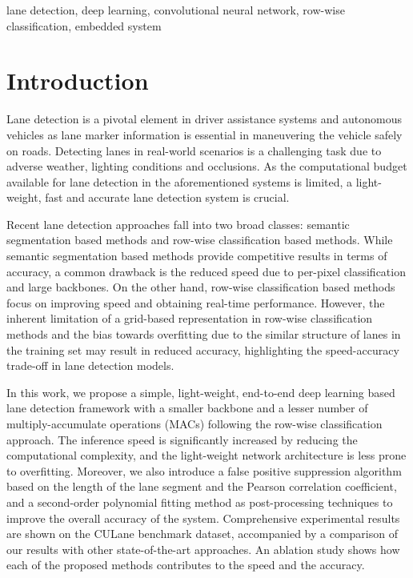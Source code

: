 \documentclass[conference]{IEEEtran}
\begin{document}
\vspace{-1em}
  
\begin{IEEEkeywords}
lane detection, deep learning, convolutional neural network, row-wise classification, embedded system 
\end{IEEEkeywords}

  


\section{Introduction}

Lane detection is a pivotal element in driver assistance systems and autonomous vehicles as lane marker information is essential in maneuvering the vehicle safely on roads. Detecting lanes in real-world scenarios is a challenging task due to adverse weather, lighting conditions and occlusions. As the computational budget available for lane detection in the aforementioned systems is limited, a light-weight, fast and accurate lane detection system is crucial.

Recent lane detection approaches fall into two broad classes: semantic segmentation based methods and row-wise classification based methods. While semantic segmentation based methods \cite{pan2018SCNN,CurveLane-NAS,hou2019learning} provide competitive results in terms of accuracy, a common drawback is the reduced speed due to per-pixel classification and large backbones. On the other hand, row-wise classification based methods \cite{yoo2020end,qin2020ultra} focus on improving speed and obtaining real-time performance. However, the inherent limitation of a grid-based representation in row-wise classification methods and the bias towards overfitting due to the similar structure of lanes in the training set may result in reduced accuracy, highlighting the speed-accuracy trade-off in lane detection models.  

In this work, we propose a simple, light-weight, end-to-end deep learning based lane detection framework with a smaller backbone and a lesser number of multiply-accumulate operations (MACs) following the row-wise classification approach. The inference speed is significantly increased by reducing the computational complexity, and the light-weight network architecture is less prone to overfitting. Moreover, we also introduce a false positive suppression algorithm based on the length of the lane segment and the Pearson correlation coefficient, and a second-order polynomial fitting method as post-processing techniques to improve the overall accuracy of the system. Comprehensive experimental results are shown on the CULane \cite{pan2018SCNN} benchmark dataset, accompanied by a comparison of our results with other state-of-the-art approaches. An ablation study shows how each of the proposed methods contributes to the speed and the accuracy.
\end{document}
